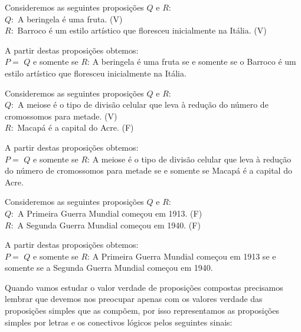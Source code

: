 \begin{itemize}
 \begin{exem} \label{(Sse 1)}
 Consideremos as seguintes proposições $Q$ e $R$:\\
 $Q:$ A beringela é uma fruta. (V) \\
 $R:$ Barroco é um estilo artístico que floresceu inicialmente na Itália. (V)

 A partir destas proposições obtemos:\\
 $P=$ $Q$ e somente se $R$: A beringela é uma fruta se e somente se o Barroco é um estilo artístico que floresceu inicialmente na Itália.
 \end{exem}

 \begin{exem} \label{(Sse 2)}
 Consideremos as seguintes proposições $Q$ e $R$:\\
 $Q:$ A meiose é o tipo de divisão celular que leva à redução do número de cromossomos para metade. (V) \\
 $R:$ Macapá é a capital do Acre. (F)

 A partir destas proposições obtemos:\\
 $P=$ $Q$ e somente se $R$:  A meiose é o tipo de divisão celular que leva à redução do número de cromossomos para metade se e somente se Macapá é a capital do Acre.
 \end{exem}

 \begin{exem} \label{(Sse 3)}
 Consideremos as seguintes proposições $Q$ e $R$:\\
 $Q:$ A Primeira Guerra Mundial começou em 1913.  (F) \\
 $R:$ A Segunda Guerra Mundial começou em 1940. (F)

 A partir destas proposições obtemos:\\
 $P=$ $Q$ e somente se $R$:  A Primeira Guerra Mundial começou em 1913 se e somente se a Segunda Guerra Mundial começou em 1940.
 \end{exem}

 \end{itemize}

 Quando vamos estudar o valor verdade de proposições compostas precisamos lembrar que devemos nos preocupar apenas com os valores verdade das proposições simples que as compõem, por isso representamos as proposições simples por letras e os conectivos lógicos pelos seguintes sinais:

